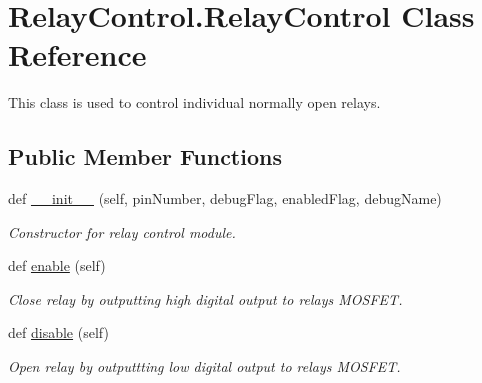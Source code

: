 \hypertarget{classRelayControl_1_1RelayControl}{}\section{Relay\+Control.\+Relay\+Control Class Reference}
\label{classRelayControl_1_1RelayControl}


This class is used to control individual normally open relays.  


\subsection*{Public Member Functions}
\begin{DoxyCompactItemize}
\item 
def \hyperlink{classRelayControl_1_1RelayControl_a2cfbdc8606b889bff3c9956c912071d6}{\+\_\+\+\_\+init\+\_\+\+\_\+} (self, pin\+Number, debug\+Flag, enabled\+Flag, debug\+Name)
\begin{DoxyCompactList}\small\item\em Constructor for relay control module. \end{DoxyCompactList}\item 
\mbox{\label{classRelayControl_1_1RelayControl_ae8c4b29ded83c1e0844445491c256628}} 
def \hyperlink{classRelayControl_1_1RelayControl_ae8c4b29ded83c1e0844445491c256628}{enable} (self)
\begin{DoxyCompactList}\small\item\em Close relay by outputting high digital output to relay\textquotesingle{}s M\+O\+S\+F\+ET. \end{DoxyCompactList}\item 
\mbox{\label{classRelayControl_1_1RelayControl_a5a01718340f5477f31287ed0cc4fe171}} 
def \hyperlink{classRelayControl_1_1RelayControl_a5a01718340f5477f31287ed0cc4fe171}{disable} (self)
\begin{DoxyCompactList}\small\item\em Open relay by outputtting low digital output to relay\textquotesingle{}s M\+O\+S\+F\+ET. \end{DoxyCompactList}\end{DoxyCompactItemize}

